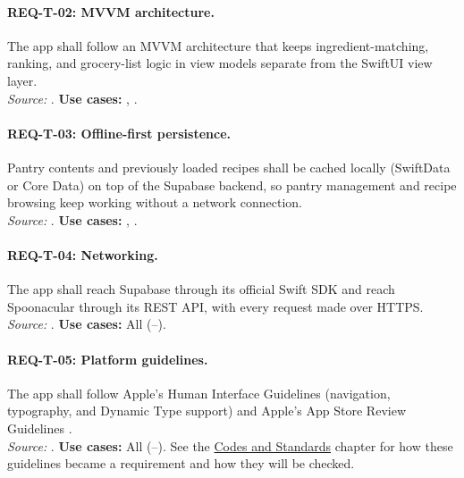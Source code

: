 \paragraph{REQ-T-02: MVVM architecture.}
 The app shall follow an MVVM architecture that keeps ingredient-matching, ranking, and grocery-list logic in view models separate from the SwiftUI view layer.\\
\textit{Source:} . \textbf{Use cases:} , .

\paragraph{REQ-T-03: Offline-first persistence.}
 Pantry contents and previously loaded recipes shall be cached locally (SwiftData or Core Data) on top of the Supabase backend, so pantry management and recipe browsing keep working without a network connection.\\
\textit{Source:} . \textbf{Use cases:} , .

\paragraph{REQ-T-04: Networking.}
 The app shall reach Supabase through its official Swift SDK and reach Spoonacular through its REST API, with every request made over HTTPS.\\
\textit{Source:} . \textbf{Use cases:} All (--).

\paragraph{REQ-T-05: Platform guidelines.}
 The app shall follow Apple's Human Interface Guidelines \cite{AppleHIG} (navigation, typography, and Dynamic Type support) and Apple's App Store Review Guidelines \cite{AppleAppStoreReview}.\\
\textit{Source:} . \textbf{Use cases:} All (--). See the \hyperref[Chapter:CodesStandards]{Codes and Standards} chapter for how these guidelines became a requirement and how they will be checked.

